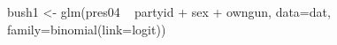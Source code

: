 \begin{Schunk}
\begin{Sinput}
 bush1 <- glm(pres04 ~ partyid + sex + owngun, data=dat, family=binomial(link=logit))
\end{Sinput}
\end{Schunk}
